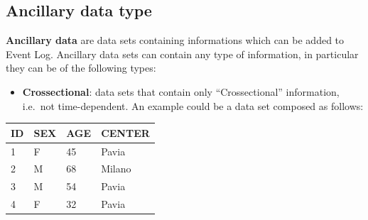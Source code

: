 \documentclass[
]{book}
\providecommand{\tightlist}{%
  \setlength{\itemsep}{0pt}\setlength{\parskip}{0pt}}
\begin{document}
\hypertarget{ancillary-data-type}{%
\subsection{Ancillary data type}\label{ancillary-data-type}}

\textbf{Ancillary data} are data sets containing informations which can be added to Event Log. Ancillary data sets can contain any type of information, in particular they can be of the following types:

\begin{itemize}
\tightlist
\item
  \textbf{Crossectional}: data sets that contain only ``Crossectional'' information, i.e.~not time-dependent.
  An example could be a data set composed as follows:
\end{itemize}

\begin{longtable}[]{@{}llll@{}}
\toprule
ID & SEX & AGE & CENTER \\
\midrule
\endhead
1 & F & 45 & Pavia \\
2 & M & 68 & Milano \\
3 & M & 54 & Pavia \\
4 & F & 32 & Pavia \\
\bottomrule
\end{longtable}
\end{document}
